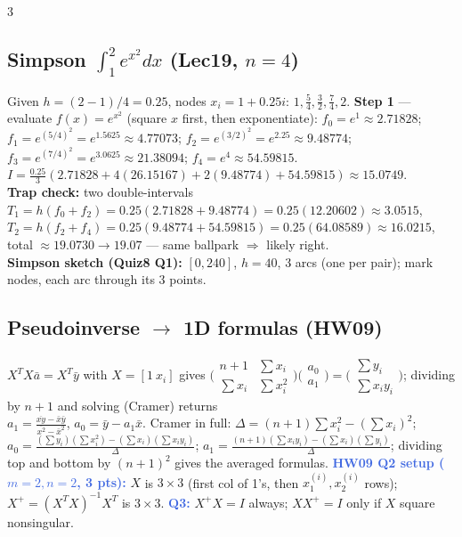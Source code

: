 \documentclass[9pt]{extarticle}
\newcommand{\wk}[1]{\textbf{\textcolor{OliveGreen}{#1}}}
\newcommand{\ex}[1]{\textbf{\textcolor{RoyalBlue}{#1}}}
\begin{document}
\begin{multicols}{3}
\begin{sloppypar}
\subsection{Simpson $\int_1^2e^{x^2}dx$ (Lec19, $n=4$)}
Given $h=(2-1)/4=0.25$, nodes $x_i=1+0.25i$: $1,\tfrac54,\tfrac32,\tfrac74,2$.
\wk{Step 1} — evaluate $f(x)=e^{x^2}$ (square $x$ first, then exponentiate): $f_0=e^{1}\approx2.71828$; $f_1=e^{(5/4)^2}=e^{1.5625}\approx4.77073$; $f_2=e^{(3/2)^2}=e^{2.25}\approx9.48774$; $f_3=e^{(7/4)^2}=e^{3.0625}\approx21.38094$; $f_4=e^{4}\approx54.59815$.\\
$I=\tfrac{0.25}3(2.71828+4(26.15167)+2(9.48774)+54.59815)\approx15.0749$.\\
\wk{Trap check:} two double-intervals $T_1=h(f_0{+}f_2)=0.25(2.71828+9.48774)=0.25(12.20602)\approx3.0515$, $T_2=h(f_2{+}f_4)=0.25(9.48774+54.59815)=0.25(64.08589)\approx16.0215$, total $\approx19.0730\to19.07$ — same ballpark $\Rightarrow$ likely right.\\
\wk{Simpson sketch (Quiz8 Q1):} $[0,240]$, $h=40$, 3 arcs (one per pair); mark nodes, each arc through its 3 points.

\subsection{Pseudoinverse $\to$ 1D formulas (HW09)}
$X^TX\bar a=X^T\bar y$ with $X=[1\ x_i]$ gives $\big(\begin{smallmatrix}n{+}1&\sum x_i\\\sum x_i&\sum x_i^2\end{smallmatrix}\big)\big(\begin{smallmatrix}a_0\\a_1\end{smallmatrix}\big)=\big(\begin{smallmatrix}\sum y_i\\\sum x_iy_i\end{smallmatrix}\big)$; dividing by $n{+}1$ and solving (Cramer) returns\\
$a_1=\tfrac{\overline{xy}-\bar x\bar y}{\overline{x^2}-\bar x^2}$, $a_0=\bar y-a_1\bar x$.
Cramer in full: $\Delta=(n{+}1)\sum x_i^2-(\sum x_i)^2$; $a_0=\tfrac{(\sum y_i)(\sum x_i^2)-(\sum x_i)(\sum x_iy_i)}{\Delta}$; $a_1=\tfrac{(n{+}1)(\sum x_iy_i)-(\sum x_i)(\sum y_i)}{\Delta}$; dividing top and bottom by $(n{+}1)^2$ gives the averaged formulas.
\ex{HW09 Q2 setup ($m{=}2,n{=}2$, 3 pts):} $X$ is $3\times3$ (first col of 1's, then $x_1^{(i)},x_2^{(i)}$ rows); $X^+=(X^TX)^{-1}X^T$ is $3\times3$. \ex{Q3:} $X^+X=I$ always; $XX^+=I$ only if $X$ square nonsingular.


\end{sloppypar}
\end{multicols}
\end{document}
